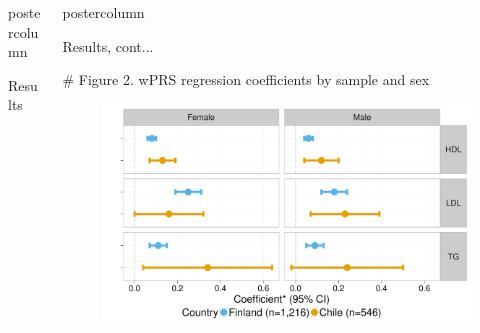 \documentclass[final]{beamer}\usepackage[]{graphicx}\usepackage[]{color}
\makeatletter
\def\maxwidth{ %
  \ifdim\Gin@nat@width>\linewidth
    \linewidth
  \else
    \Gin@nat@width
  \fi
}
\newenvironment{knitrout}{}{} %
\newlength{\twocolwid}
\newlength{\threecolwid}
\makeatother
\begin{document}
\begin{frame}[t]
\begin{columns}[T]
\begin{column}{\twocolwid}
\begin{beamercolorbox}[center,wd=\textwidth]{postercolumn}
\begin{block}{Results}
        \end{block}

\end{beamercolorbox}
\end{column}




\begin{column}{\threecolwid}
\begin{beamercolorbox}[center,wd=\textwidth]{postercolumn}


        \vfill

        \begin{block}{Results, cont...}
        
        
          
        \centering
# Figure 2. wPRS regression coefficients by sample and sex




        \begin{figure}
\begin{knitrout}
\color{fgcolor}
\includegraphics[width=\maxwidth]{figure/fig3-2-poster-1} 

\end{knitrout}
        \end{figure}
        

\end{block}
\end{beamercolorbox}
\end{column}
\end{columns}
\end{frame}
\end{document}

